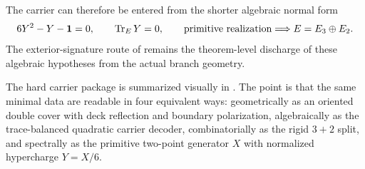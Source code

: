 \begin{remark}
The carrier can therefore be entered from the shorter algebraic normal form
\[
6Y^2-Y-\mathbf 1=0,
\qquad
\operatorname{Tr}_EY=0,
\qquad
\text{primitive realization}
\Longrightarrow
E=E_3\oplus E_2.
\]
The exterior-signature route of  remains the theorem-level discharge
of these algebraic hypotheses from the actual branch geometry.
\end{remark}

The hard carrier package is summarized visually in . The point is
that the same minimal data are readable in four equivalent ways: geometrically as an oriented
double cover with deck reflection and boundary polarization, algebraically as the trace-balanced
quadratic carrier decoder, combinatorially as the rigid $3+2$ split, and spectrally as the
primitive two-point generator $X$ with normalized hypercharge $Y=X/6$.

